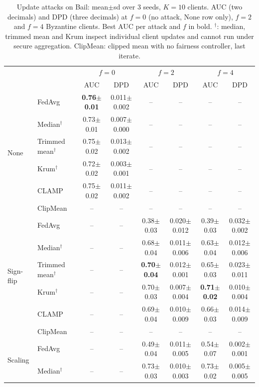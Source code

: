 \begin{table}[tbp]
\centering
\scriptsize
\setlength{\tabcolsep}{2pt}
\caption{Update attacks on Bail: mean$\pm$sd over 3 seeds, $K=10$ clients. AUC (two decimals) and DPD (three decimals) at $f=0$ (no attack, None row only), $f=2$ and $f=4$ Byzantine clients. Best AUC per attack and $f$ in bold. $^\dagger$: median, trimmed mean and Krum inspect individual client updates and cannot run under secure aggregation. ClipMean: clipped mean with no fairness controller, last iterate.}
\label{tab:e3_bail}
\begin{tabular}{llcccccc}
\toprule
 & & \multicolumn{2}{c}{$f=0$} & \multicolumn{2}{c}{$f=2$} & \multicolumn{2}{c}{$f=4$} \\
 & & AUC & DPD & AUC & DPD & AUC & DPD \\
\midrule
\multirow{6}{*}{None} & FedAvg & \textbf{0.76$\pm$0.01} & 0.011$\pm$0.002 & -- & -- & -- & -- \\
 & Median$^\dagger$ & 0.73$\pm$0.01 & 0.007$\pm$0.000 & -- & -- & -- & -- \\
 & Trimmed mean$^\dagger$ & 0.75$\pm$0.02 & 0.013$\pm$0.002 & -- & -- & -- & -- \\
 & Krum$^\dagger$ & 0.72$\pm$0.02 & 0.003$\pm$0.001 & -- & -- & -- & -- \\
 & CLAMP & 0.75$\pm$0.02 & 0.011$\pm$0.002 & -- & -- & -- & -- \\
 & ClipMean & -- & -- & -- & -- & -- & -- \\
\midrule
\multirow{6}{*}{Sign-flip} & FedAvg & -- & -- & 0.38$\pm$0.03 & 0.020$\pm$0.012 & 0.39$\pm$0.03 & 0.032$\pm$0.002 \\
 & Median$^\dagger$ & -- & -- & 0.68$\pm$0.04 & 0.011$\pm$0.006 & 0.63$\pm$0.04 & 0.012$\pm$0.006 \\
 & Trimmed mean$^\dagger$ & -- & -- & \textbf{0.70$\pm$0.04} & 0.012$\pm$0.001 & 0.65$\pm$0.03 & 0.023$\pm$0.011 \\
 & Krum$^\dagger$ & -- & -- & 0.70$\pm$0.03 & 0.007$\pm$0.004 & \textbf{0.71$\pm$0.02} & 0.010$\pm$0.004 \\
 & CLAMP & -- & -- & 0.69$\pm$0.04 & 0.010$\pm$0.009 & 0.66$\pm$0.03 & 0.014$\pm$0.009 \\
 & ClipMean & -- & -- & -- & -- & -- & -- \\
\midrule
\multirow{6}{*}{Scaling} & FedAvg & -- & -- & 0.49$\pm$0.04 & 0.011$\pm$0.005 & 0.54$\pm$0.07 & 0.002$\pm$0.001 \\
 & Median$^\dagger$ & -- & -- & 0.73$\pm$0.03 & 0.010$\pm$0.003 & 0.73$\pm$0.02 & 0.005$\pm$0.005 \\

\end{tabular}
\end{table}
